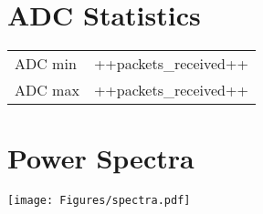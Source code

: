 \section* {ADC Statistics}

\begin{tabular}{p{5cm}p{5cm}}
    ADC min              & ++packets_received++                                         \\
    ADC max              & ++packets_received++                                         \\
\end{tabular}
    

\section* {Power Spectra}

\texttt{[image: Figures/spectra.pdf]}

